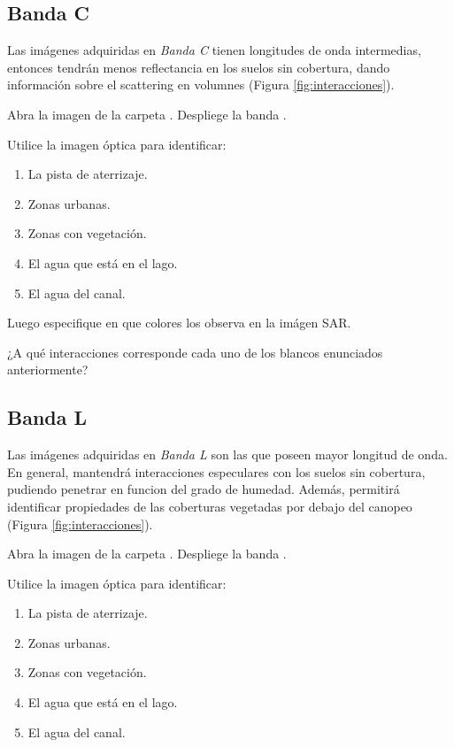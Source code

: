 \subsection{Banda C}

Las imágenes adquiridas en \emph{Banda C} tienen longitudes de onda intermedias, entonces tendrán menos reflectancia en los suelos sin cobertura, dando información sobre el scattering en volumnes (Figura \ref{fig:interacciones}).

Abra la imagen  de la carpeta . Despliege la banda .

Utilice la imagen óptica para identificar:

\begin{enumerate}
    \item La pista de aterrizaje.
    \item Zonas urbanas.
    \item Zonas con vegetación.
    \item El agua que está en el lago.
    \item El agua del canal.
\end{enumerate}
Luego especifique en que colores los observa en la imágen SAR.


\begin{que}
    ¿A qué interacciones corresponde cada uno de los blancos enunciados anteriormente?
\end{que}

\subsection{Banda L}

Las imágenes adquiridas en \emph{Banda L} son las que poseen mayor longitud de onda. En general, mantendrá interacciones especulares con los suelos sin cobertura, pudiendo penetrar en funcion del grado de humedad. Además, permitirá identificar propiedades de las coberturas vegetadas por debajo del canopeo (Figura \ref{fig:interacciones}).

Abra la imagen  de la carpeta . Despliege la banda .


Utilice la imagen óptica para identificar:

\begin{enumerate}
    \item La pista de aterrizaje.
    \item Zonas urbanas.
    \item Zonas con vegetación.
    \item El agua que está en el lago.
    \item El agua del canal.
\end{enumerate}

